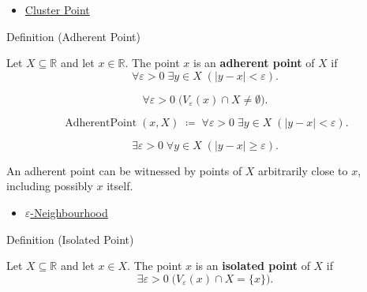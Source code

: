 \begin{dependencies}
\begin{itemize}
  \item \hyperref[def:cluster-point-r]{Cluster Point}
\end{itemize}
\end{dependencies}


\begin{definitionbox}{Definition (Adherent Point)}
\begin{definition}
\label{def:adherent-point-r}
Let $X\subseteq\mathbb{R}$ and let $x\in\mathbb{R}$. The point $x$ is
an \textbf{adherent point} of $X$ if
\[
  \forall\varepsilon>0\;\exists y\in X\;(|y-x|<\varepsilon).
\]
\end{definition}
\end{definitionbox}

\begin{remark*}
\[
  \forall\varepsilon>0\;\bigl(V_\varepsilon(x)\cap X\neq\emptyset\bigr).
\]
\end{remark*}

\begin{remark*}
\[
  \operatorname{AdherentPoint}(x,X)
  \;\coloneqq\;
  \forall\varepsilon>0\;\exists y\in X\;(|y-x|<\varepsilon).
\]
\end{remark*}

\begin{remark*}
\[
  \exists\varepsilon>0\;\forall y\in X\;(|y-x|\geq\varepsilon).
\]
\end{remark*}

\begin{remark*}[Interpretation]
An adherent point can be witnessed by points of $X$ arbitrarily close to
$x$, including possibly $x$ itself.
\end{remark*}

\begin{dependencies}
\begin{itemize}
  \item \hyperref[def:epsilon-neighbourhood]{$\varepsilon$-Neighbourhood}
\end{itemize}
\end{dependencies}

\begin{definitionbox}{Definition (Isolated Point)}
\begin{definition}
\label{def:isolated-point-r}
Let $X\subseteq\mathbb{R}$ and let $x\in X$. The point $x$ is an
\textbf{isolated point} of $X$ if
\[
  \exists\varepsilon>0\;\bigl(V_\varepsilon(x)\cap X=\{x\}\bigr).
\]
\end{definition}
\end{definitionbox}

